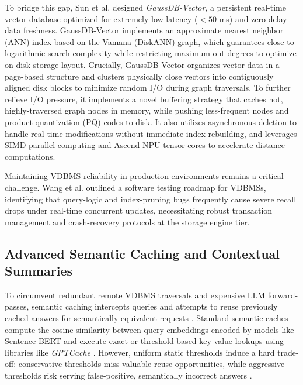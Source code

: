 \documentclass{ieeeaccess}
\begin{document}
To bridge this gap, Sun et al. \cite{sun-gaussdb-vector-2025} designed \emph{GaussDB-Vector}, a persistent real-time vector database optimized for extremely low latency ($<50$ ms) and zero-delay data freshness. GaussDB-Vector implements an approximate nearest neighbor (ANN) index based on the Vamana (DiskANN) graph, which guarantees close-to-logarithmic search complexity while restricting maximum out-degrees to optimize on-disk storage layout. Crucially, GaussDB-Vector organizes vector data in a page-based structure and clusters physically close vectors into contiguously aligned disk blocks to minimize random I/O during graph traversals. To further relieve I/O pressure, it implements a novel buffering strategy that caches hot, highly-traversed graph nodes in memory, while pushing less-frequent nodes and product quantization (PQ) codes to disk. It also utilizes asynchronous deletion to handle real-time modifications without immediate index rebuilding, and leverages SIMD parallel computing and Ascend NPU tensor cores to accelerate distance computations.

Maintaining VDBMS reliability in production environments remains a critical challenge. Wang et al. \cite{wang-reliable-vector-2025} outlined a software testing roadmap for VDBMSs, identifying that query-logic and index-pruning bugs frequently cause severe recall drops under real-time concurrent updates, necessitating robust transaction management and crash-recovery protocols at the storage engine tier.

\subsection{Advanced Semantic Caching and Contextual Summaries}
To circumvent redundant remote VDBMS traversals and expensive LLM forward-passes, semantic caching intercepts queries and attempts to reuse previously cached answers for semantically equivalent requests \cite{ruan-asteria-2025, singh-krites-2026}. Standard semantic caches compute the cosine similarity between query embeddings encoded by models like Sentence-BERT \cite{reimers-sbert-2019} and execute exact or threshold-based key-value lookups using libraries like \emph{GPTCache} \cite{bang-gptcache-2023}. However, uniform static thresholds induce a hard trade-off: conservative thresholds miss valuable reuse opportunities, while aggressive thresholds risk serving false-positive, semantically incorrect answers \cite{singh-krites-2026}.
\end{document}
